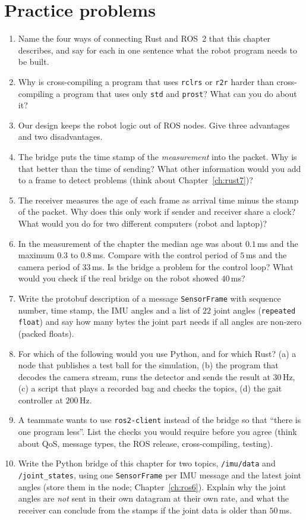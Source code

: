 \section*{Practice problems}
\begin{enumerate}[label=\textbf{\thechapter.\arabic*}]
  \item Name the four ways of connecting Rust and ROS~2 that this chapter describes, and say for each in one sentence what the robot program needs to be built.
  \item Why is cross-compiling a program that uses \verb!rclrs! or \verb!r2r! harder than cross-compiling a program that uses only \verb!std! and \verb!prost!? What can you do about it?
  \item Our design keeps the robot logic out of ROS nodes. Give three advantages and two disadvantages.
  \item The bridge puts the time stamp of the \emph{measurement} into the packet. Why is that better than the time of sending? What other information would you add to a frame to detect problems (think about Chapter~\ref{ch:rust7})?
  \item The receiver measures the age of each frame as arrival time minus the stamp of the packet. Why does this only work if sender and receiver share a clock? What would you do for two different computers (robot and laptop)?
  \item In the measurement of the chapter the median age was about $0.1$\,ms and the maximum $0.3$ to $0.8$\,ms. Compare with the control period of $5$\,ms and the camera period of $33$\,ms. Is the bridge a problem for the control loop? What would you check if the real bridge on the robot showed $40$\,ms?
  \item Write the protobuf description of a message \verb!SensorFrame! with sequence number, time stamp, the IMU angles and a list of $22$ joint angles (\verb!repeated float!) and say how many bytes the joint part needs if all angles are non-zero (packed floats).
  \item For which of the following would you use Python, and for which Rust? (a) a node that publishes a test ball for the simulation, (b) the program that decodes the camera stream, runs the detector and sends the result at $30$\,Hz, (c) a script that plays a recorded bag and checks the topics, (d) the gait controller at $200$\,Hz.
  \item A teammate wants to use \verb!ros2-client! instead of the bridge so that ``there is one program less''. List the checks you would require before you agree (think about QoS, message types, the ROS release, cross-compiling, testing).
  \item[\textbf{\thechapter.10}$\star$] Write the Python bridge of this chapter for two topics, \verb!/imu/data! and \verb!/joint_states!, using one \verb!SensorFrame! per IMU message and the latest joint angles (store them in the node; Chapter~\ref{ch:ros6}). Explain why the joint angles are \emph{not} sent in their own datagram at their own rate, and what the receiver can conclude from the stamps if the joint data is older than $50$\,ms.
\end{enumerate}
